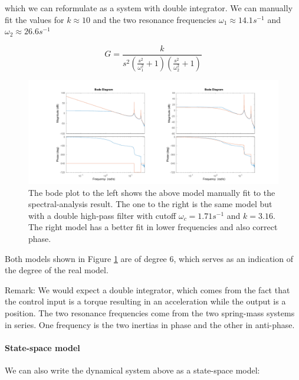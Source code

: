 \documentclass[a4paper,11pt]{article}
\begin{document}
which we can reformulate as a system with double integrator. We can manually fit the values for $k \approx 10$ and the two resonance frequencies $\omega_1 \approx 14.1 s^{-1} $ and $\omega_2 \approx 26.6 s^{-1}$

\begin{equation}
G = \frac{k}{s^2 (\frac{s^2}{\omega_1^2} + 1)(\frac{s^2}{\omega_2^2} + 1)}
\end{equation}

\begin{figure}[H]
\centering
\includegraphics[width=\textwidth]{images/2_physical_model_fit}
\caption{The bode plot to the left shows the above model manually fit to the spectral-analysis result. The one to the right is the same model but with a double high-pass filter with cutoff $\omega_c = 1.71s^{-1}$ and $k = 3.16$. The right model has a better fit in lower frequencies and also correct phase.}
\label{fig:physical_model_fit}
\end{figure}

Both models shown in Figure \ref{fig:physical_model_fit} are of degree 6, which serves as an indication of the degree of the real model.

Remark: We would expect a double integrator, which comes from the fact that the control input is a torque resulting in an acceleration while the output is a position. The two resonance frequencies come from the two spring-mass systems in series. One frequency is the two inertias in phase and the other in anti-phase.

\paragraph{State-space model} We can also write the dynamical system above as a state-space model:

\end{document}

